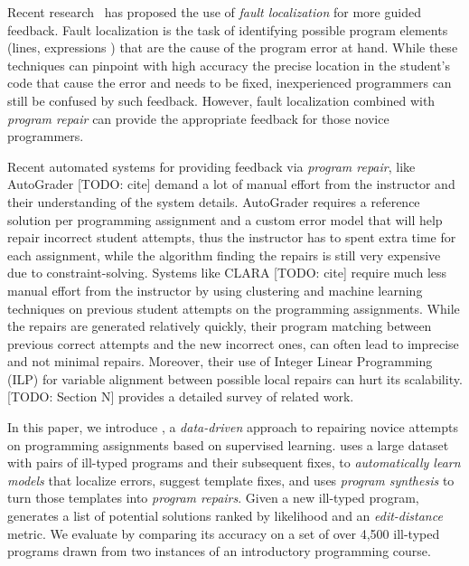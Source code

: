 Recent research~\citep[][]{Seidel:2017, Zhang2014-lv} has proposed the use of
\emph{fault localization} for more guided feedback. Fault localization is the
task of identifying possible program elements (\eg lines, expressions \etc) that
are the cause of the program error at hand. While these techniques can pinpoint
with high accuracy the precise location in the student's code that cause the
error and needs to be fixed, inexperienced programmers can still be confused by
such feedback. However, fault localization combined with \emph{program repair}
can provide the appropriate feedback for those novice programmers.

Recent automated systems for providing feedback via \emph{program repair}, like
AutoGrader [TODO: cite] demand a lot of manual effort from the instructor and
their understanding of the system details. AutoGrader requires a reference
solution per programming assignment and a custom error model that will help
repair incorrect student attempts, thus the instructor has to spent extra time
for each assignment, while the algorithm finding the repairs is still very
expensive due to constraint-solving. Systems like CLARA [TODO: cite] require
much less manual effort from the instructor by using clustering and machine
learning techniques on previous student attempts on the programming assignments.
While the repairs are generated relatively quickly, their program matching
between previous correct attempts and the new incorrect ones, can often lead to
imprecise and not minimal repairs. Moreover, their use of Integer Linear
Programming (ILP) for variable alignment between possible local repairs can hurt
its scalability. [TODO: Section N] provides a detailed survey of related work.

In this paper, we introduce \toolname, a \emph{data-driven} approach to
repairing novice attempts on programming assignments based on supervised
learning. \toolname uses a large dataset with pairs of ill-typed programs and
their subsequent fixes, to \emph{automatically learn models} that localize
errors, suggest template fixes, and uses \emph{program synthesis} to turn those
templates into \emph{program repairs}. Given a new ill-typed program, \toolname
generates a list of potential solutions ranked by likelihood and an
\emph{edit-distance} metric. We evaluate \toolname by comparing its accuracy on
a set of over 4,500 ill-typed \ocaml programs drawn from two instances of an
introductory programming course.


